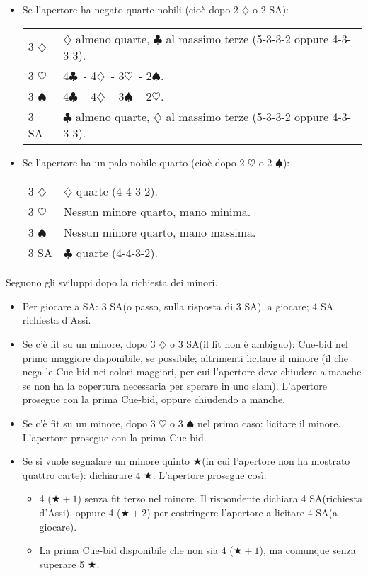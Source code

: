 \documentclass[a4paper,10pt]{article}
\renewcommand{\c}{$\clubsuit$\xspace}
\renewcommand{\d}{$\diamondsuit$\xspace}
\newcommand{\h}{$\heartsuit$\xspace}
\newcommand{\s}{$\spadesuit$\xspace}
\renewcommand{\j}{$\bigstar$\xspace}
\newcommand{\sa}{SA\xspace}
\newcommand{\smallspace}{\vskip0.3cm}
\newenvironment{twocol}
  {\smallspace\noindent\begin{tabular}{l p{0.8\textwidth}}}
  {\end{tabular}\smallspace}
\begin{document}
\begin{itemize}
 \item Se l'apertore ha negato quarte nobili (cioè dopo 2 \d o 2 \sa):
  \begin{twocol}
    3 \d & \d almeno quarte, \c al massimo terze (5-3-3-2 oppure 4-3-3-3).\\
    3 \h & 4\c\ - 4\d\ - 3\h\ - 2\s.\\
    3 \s & 4\c\ - 4\d\ - 3\s\ - 2\h.\\
    3 \sa & \c almeno quarte, \d al massimo terze (5-3-3-2 oppure 4-3-3-3).
  \end{twocol}

 \item Se l'apertore ha un palo nobile quarto (cioè dopo 2 \h o 2 \s):
  \begin{twocol}
    3 \d & \d quarte (4-4-3-2).\\
    3 \h & Nessun minore quarto, mano minima.\\
    3 \s & Nessun minore quarto, mano massima.\\
    3 \sa & \c quarte (4-4-3-2).
  \end{twocol}
\end{itemize}

\noindent Seguono gli sviluppi dopo la richiesta dei minori.
\begin{itemize}
 \item Per giocare a \sa: 3 \sa (o passo, sulla risposta di 3 \sa), a giocare; 4 \sa richiesta d'Assi.
 \item Se c'è fit su un minore, dopo 3 \d o 3 \sa (il fit non è ambiguo): Cue-bid nel primo maggiore disponibile, se possibile; altrimenti licitare il minore (il che nega le Cue-bid nei colori maggiori, per cui l'apertore deve chiudere a manche se non ha la copertura necessaria per sperare in uno slam).
 L'apertore prosegue con la prima Cue-bid, oppure chiudendo a manche.
 \item Se c'è fit su un minore, dopo 3 \h o 3 \s nel primo caso: licitare il minore.
 L'apertore prosegue con la prima Cue-bid.
 \item Se si vuole segnalare un minore quinto \j (in cui l'apertore non ha mostrato quattro carte): dichiarare 4 \j.
 L'apertore prosegue così:
 \begin{itemize}
  \item 4 ($\bigstar+1$) senza fit terzo nel minore. Il rispondente dichiara 4 \sa (richiesta d'Assi), oppure 4 ($\bigstar+2$) per costringere l'apertore a licitare 4 \sa (a giocare).
  \item La prima Cue-bid disponibile che non sia 4 ($\bigstar+1$), ma comunque senza superare 5 \j.
  
 \end{itemize}
\end{itemize}
\end{document}
